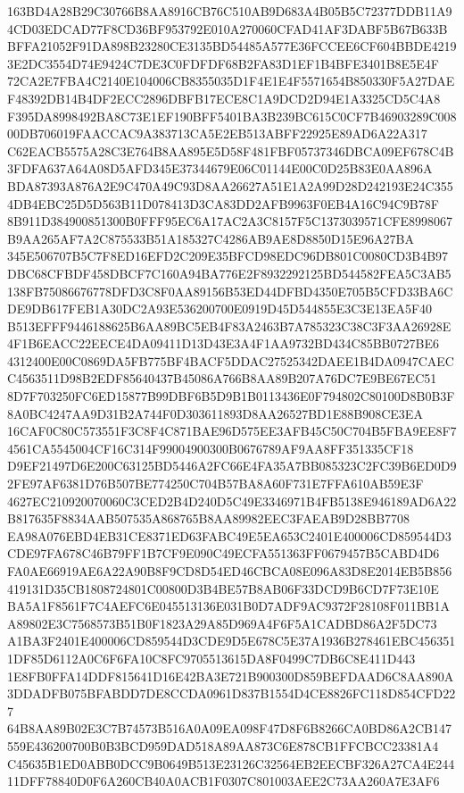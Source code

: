 \documentclass[UTF8,fontset=fandol,zihao=-4,a4paper]{ctexart}
\begin{document}
{{163BD4A28B29C30766B8AA8916CB76C510AB9D683A4B05B5C72377DDB11A94CD03EDCAD77F8CD36BF953792E010A270060CFAD41AF3DABF5B67B633B
BFFA21052F91DA898B23280CE3135BD54485A577E36FCCEE6CF604BBDE42193E2DC3554D74E9424C7DE3C0FDFDF68B2FA83D1EF1B4BFE3401B8E5E4F
72CA2E7FBA4C2140E104006CB8355035D1F4E1E4F5571654B850330F5A27DAEF48392DB14B4DF2ECC2896DBFB17ECE8C1A9DCD2D94E1A3325CD5C4A8
F395DA8998492BA8C73E1EF190BFF5401BA3B239BC615C0CF7B46903289C00800DB706019FAACCAC9A383713CA5E2EB513ABFF22925E89AD6A22A317
C62EACB5575A28C3E764B8AA895E5D58F481FBF05737346DBCA09EF678C4B3FDFA637A64A08D5AFD345E37344679E06C01144E00C0D25B83E0AA896A
BDA87393A876A2E9C470A49C93D8AA26627A51E1A2A99D28D242193E24C3554DB4EBC25D5D563B11D078413D3CA83DD2AFB9963F0EB4A16C94C9B78F
8B911D384900851300B0FFF95EC6A17AC2A3C8157F5C1373039571CFE8998067B9AA265AF7A2C875533B51A185327C4286AB9AE8D8850D15E96A27BA
345E506707B5C7F8ED16EFD2C209E35BFCD98EDC96DB801C0080CD3B4B97DBC68CFBDF458DBCF7C160A94BA776E2F8932292125BD544582FEA5C3AB5
138FB75086676778DFD3C8F0AA89156B53ED44DFBD4350E705B5CFD33BA6CDE9DB617FEB1A30DC2A93E536200700E0919D45D544855E3C3E13EA5F40
B513EFFF9446188625B6AA89BC5EB4F83A2463B7A785323C38C3F3AA26928E4F1B6EACC22EECE4DA09411D13D43E3A4F1AA9732BD434C85BB0727BE6
4312400E00C0869DA5FB775BF4BACF5DDAC27525342DAEE1B4DA0947CAECC4563511D98B2EDF85640437B45086A766B8AA89B207A76DC7E9BE67EC51
8D7F703250FC6ED15877B99DBF6B5D9B1B0113436E0F794802C80100D8B0B3F8A0BC4247AA9D31B2A744F0D303611893D8AA26527BD1E88B908CE3EA
16CAF0C80C573551F3C8F4C871BAE96D575EE3AFB45C50C704B5FBA9EE8F74561CA5545004CF16C314F99004900300B0676789AF9AA8FF351335CF18
D9EF21497D6E200C63125BD5446A2FC66E4FA35A7BB085323C2FC39B6ED0D92FE97AF6381D76B507BE774250C704B57BA8A60F731E7FFA610AB59E3F
4627EC210920070060C3CED2B4D240D5C49E3346971B4FB5138E946189AD6A22B817635F8834AAB507535A868765B8AA89982EEC3FAEAB9D28BB7708
EA98A076EBD4EB31CE8371ED63FABC49E5EA653C2401E400006CD859544D3CDE97FA678C46B79FF1B7CF9E090C49ECFA551363FF0679457B5CABD4D6
FA0AE66919AE6A22A90B8F9CD8D54ED46CBCA08E096A83D8E2014EB5B856419131D35CB1808724801C00800D3B4BE57B8AB06F33DCD9B6CD7F73E10E
BA5A1F8561F7C4AEFC6E045513136E031B0D7ADF9AC9372F28108F011BB1AA89802E3C7568573B51B0F1823A29A85D969A4F6F5A1CADBD86A2F5DC73
A1BA3F2401E400006CD859544D3CDE9D5E678C5E37A1936B278461EBC4563511DF85D6112A0C6F6FA10C8FC9705513615DA8F0499C7DB6C8E411D443
1E8FB0FFA14DDF815641D16E42BA3E721B900300D859BEFDAAD6C8AA890A3DDADFB075BFABDD7DE8CCDA0961D837B1554D4CE8826FC118D854CFD227
64B8AA89B02E3C7B74573B516A0A09EA098F47D8F6B8266CA0BD86A2CB147559E436200700B0B3BCD959DAD518A89AA873C6E878CB1FFCBCC23381A4
C45635B1ED0ABB0DCC9B0649B513E23126C32564EB2EECBF326A27CA4E24411DFF78840D0F6A260CB40A0ACB1F0307C801003AEE2C73AA260A7E3AF6
}}
\end{document}
